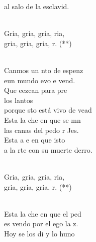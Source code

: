 \documentclass[12pt]{article}
\begin{document}
\begin{multicols*}{2}
\begin{cancion}
	al salo de la esclavid. \\\jump\\
	\begin{chorus}%
	Gria, gria, gria, ria,\\
	gria, gria, gria, r. (**)\\
	\end{chorus}%
	\jump\\
	Canmos un nto de espenz\\
	eun mundo evo e vend.  \\
	Que eezcan para pre \\
	los lantos\\
	porque sto está vivo de vead\\
	Esta  la che en que se mn\\
	las canas del pedo r Jes.\\
	Esta a e en que isto\\
	a la rte con su muerte derro. \\\jump\\
	\begin{chorus}%
	Gria, gria, gria, ria,\\
	gria, gria, gria, r. (**)\\
	\end{chorus}%
	\jump\\
	Esta  la che en que el ped\\
	es vendo por el ego  la z.\\
	Hoy se  los di y lo huno\\

\end{cancion}
\end{multicols*}
\end{document}
